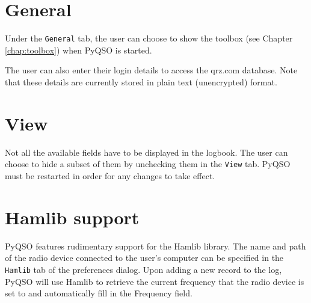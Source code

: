 \documentclass[11pt, a4paper]{report}
\begin{document}
\section{General}
Under the \texttt{General} tab, the user can choose to show the toolbox (see Chapter \ref{chap:toolbox}) when PyQSO is started.

The user can also enter their login details to access the qrz.com database. Note that these details are currently stored in plain text (unencrypted) format.

\section{View}
Not all the available fields have to be displayed in the logbook. The user can choose to hide a subset of them by unchecking them in the \texttt{View} tab. PyQSO must be restarted in order for any changes to take effect.

\section{Hamlib support}\label{sect:hamlib}
PyQSO features rudimentary support for the Hamlib library. The name and path of the radio device connected to the user's computer can be specified in the \texttt{Hamlib} tab of the preferences dialog. Upon adding a new record to the log, PyQSO will use Hamlib to retrieve the current frequency that the radio device is set to and automatically fill in the Frequency field.


\end{document}
